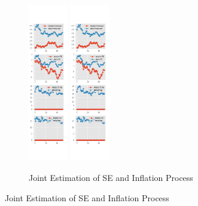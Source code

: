 \documentclass[]{article}
\begin{document}
\begin{figure}[htbp]
\begin{subfigure}[b]{\textwidth}
	\end{subfigure}
	\vspace{1em}
	\vfill
	\begin{subfigure}[b]{\textwidth}
		\centering
		\caption{Joint Estimation of SE and Inflation Process}
		\label{SE_diag_joint_SCE}
		\includegraphics[width=0.19\textwidth]{figures/sce_se_est_joint_diag0.png}
		\includegraphics[width=0.19\textwidth]{figures/sce_se_est_joint_diag1.png}

\end{subfigure}
\end{figure}
\end{document}
